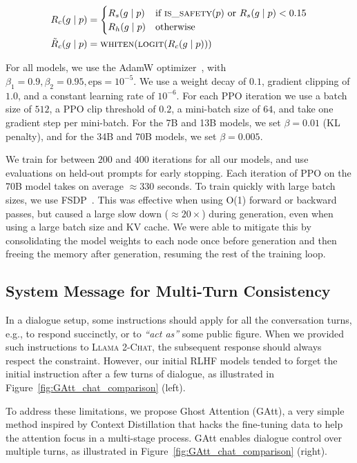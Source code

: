 \begin{align*}
R_c(g \mid p) &= 
    \begin{cases} 
        R_s(g \mid p) & \text{if } \textsc{is\_safety}(p) \text{ or } R_s(g \mid p) < 0.15 \\
        R_h(g \mid p) & \text{otherwise}
    \end{cases} \\
\tilde{R}_c(g \mid p) &= \textsc{whiten}(\textsc{logit}(R_c(g \mid p)))
\end{align*}

For all models, we use the AdamW optimizer~\citep{loshchilov2017decoupled}, with $\beta_1 = 0.9, \beta_2 = 0.95, \text{eps} = 10^{-5}$. We use a weight decay of $0.1$, gradient clipping of $1.0$, and a constant learning rate of $10^{-6}$. For each PPO iteration we use a batch size of $512$, a PPO clip threshold of $0.2$, a mini-batch size of $64$, and take one gradient step per mini-batch. For the 7B and 13B models, we set $\beta = 0.01$ (KL penalty), and for the 34B and 70B models, we set $\beta = 0.005$.

We train for between $200$ and $400$ iterations for all our models, and use evaluations on held-out prompts for early stopping. Each iteration of PPO on the 70B model takes on average $\approx 330$ seconds. To train quickly with large batch sizes, we use FSDP~\citep{zhao2023fsdp}. This was effective when using O(1) forward or backward passes, but caused a large slow down ($\approx 20\times$) during generation, even when using a large batch size and KV cache. We were able to mitigate this by consolidating the model weights to each node once before generation and then freeing the memory after generation, resuming the rest of the training loop.

\subsection{System Message for Multi-Turn Consistency}
\label{subsec:gatt}

In a dialogue setup, some instructions should apply for all the conversation turns, e.g., to respond succinctly, or to \textit{``act as''} some public figure. When we provided such instructions to \textsc{Llama 2-Chat}, the subsequent response should always respect the constraint. However, our initial RLHF models tended to forget the initial instruction after a few turns of dialogue, as illustrated in Figure~\ref{fig:GAtt_chat_comparison} (left). 

To address these limitations, we propose Ghost Attention (GAtt), a very simple method inspired by Context Distillation \citep{bai2022constitutional} that hacks the fine-tuning data to help the attention focus in a multi-stage process. GAtt enables dialogue control over multiple turns, as illustrated in Figure~\ref{fig:GAtt_chat_comparison} (right). 

